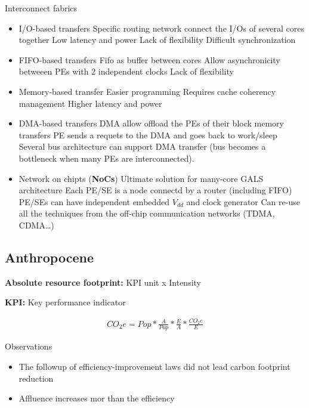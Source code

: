 \bigbreak
Interconnect fabrics
\begin{itemize}
  \item I/O-based transfers
    \subitem Specific routing network connect the I/Os of several cores together
    \subitem Low latency and power
    \subitem Lack of flexibility
    \subitem Difficult synchronization
  \item FIFO-based transfers
    \subitem Fifo as buffer between cores
    \subitem Allow asynchronicity betweeen PEs with 2 independent clocks
    \subitem Lack of flexibility
  \item Memory-based transfer
    \subitem Easier programming
    \subitem Requires cache coherency management
    \subitem Higher latency and power
  \item DMA-based transfers
    \subitem DMA allow offload the PEs of their block memory transfers
    \subitem PE sends a requets to the DMA and goes back to work/sleep
    \subitem Several bus architecture can support DMA transfer (bus becomes a bottleneck when many PEs are interconnected).
  \item Network on chipts (\textbf{NoCs})
    \subitem Ultimate solution for many-core GALS architecture
    \subitem Each PE/SE is a node connectd by a router (including FIFO)
    \subitem PE/SEs can have independent embedded \(V_{dd}\) and clock generator
    \subitem Can re-use all the techniques from the off-chip communication networks (TDMA, CDMA\dots)
\end{itemize}



\subsection{Anthropocene}

\textbf{Absolute resource footprint:} KPI unit x Intensity

\textbf{KPI:} Key performance indicator

\begin{align}
  CO_2e = Pop * \frac{A}{Pop} * \frac{E}{A} * \frac{CO_2e}{E}
\end{align}

\bigbreak
Observations
\begin{itemize}
  \item The followup of efficiency-improvement laws did not lead carbon footprint reduction
  \item Affluence increases mor than the efficiency
\end{itemize}

